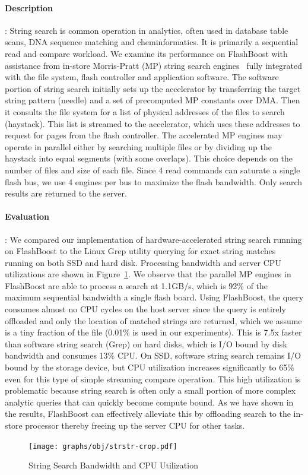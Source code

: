 \paragraph{Description} :
String search is common operation in analytics, often used in
database table scans, DNA sequence matching and cheminformatics. It is 
primarily a sequential read and compare workload. We
examine its performance on FlashBoost with assistance from in-store Morris-Pratt (MP) 
string search engines~\cite{mpalgo} fully integrated with the file system, flash controller
and application software.  The software portion of string search initially sets
up the accelerator by transferring the target string pattern (needle) and a set
of precomputed MP constants over DMA. Then it consults the file system for a
list of physical addresses of the files to search (haystack).  This list is
streamed to the accelerator, which uses these addresses to request for pages
from the flash controller.  The accelerated MP engines may operate in parallel
either by searching multiple files or by dividing up the haystack into equal
segments (with some overlaps). This choice depends on the number of files and
size of each file. Since 4 read commands can saturate a single flash bus, we
use 4 engines per bus to maximize the flash bandwidth. Only
search results are returned to the server. 

\paragraph{Evaluation} :
We compared our implementation of hardware-accelerated string search running on
FlashBoost to the Linux Grep utility querying for exact string matches running
on both SSD and hard disk. Processing bandwidth and server CPU utilizations are
shown in Figure~\ref{fig:result_strstr}. We observe that the parallel MP
engines in FlashBoost are able to process a search at 1.1GB/s, which is 92\% of
the maximum sequential bandwidth a single flash board. Using FlashBoost, the
query consumes almost no CPU cycles on the host server since the query is
entirely offloaded and only the location of matched strings are returned, which
we assume is a tiny fraction of the file (0.01\% is used in our experiments).
This is 7.5x faster than software string search (Grep) on hard disks, which is
I/O bound by disk bandwidth and consumes 13\% CPU. On SSD, software string
search remains I/O bound by the storage device, but CPU utilization increases
significantly to 65\% even for this type of simple streaming compare operation.
This high utilization is problematic because string search is often only a small portion 
of more complex analytic queries that can quickly become compute bound.  As we
have shown in the results, FlashBoost can effectively alleviate this by
offloading search to the in-store processor thereby freeing up the server CPU
for other tasks. 
 


\begin{figure}[t]
	\centering
	\texttt{[image: graphs/obj/strstr-crop.pdf]}
	\caption{String Search Bandwidth and CPU Utilization}
	\label{fig:result_strstr}
\end{figure}

